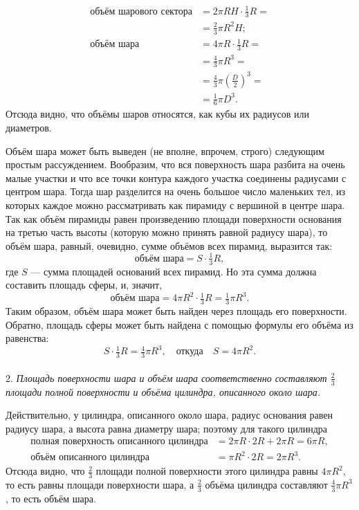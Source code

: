 \begin{align*}
\text{объём шарового сектора}&= 2\pi RH\cdot \tfrac13 R =
\\
&= \tfrac23 \pi R^2 H;
\\
\text{объём шара} &= 4\pi R\cdot \tfrac13 R = 
\\
&=\tfrac43\pi R^3=
\\
&= \tfrac43\pi\left(\frac D2\right)^3=
\\
&= \tfrac16\pi D^3.
\end{align*}
Отсюда видно, что объёмы шаров относятся, как кубы их радиусов или диаметров.

Объём шара может быть выведен (не вполне, впрочем, строго) следующим простым рассуждением.
Вообразим, что вся поверхность шара разбита на очень малые участки и что все точки контура каждого участка соединены радиусами с центром шара.
Тогда шар разделится на очень большое число маленьких тел, из которых каждое можно рассматривать как пирамиду с вершиной в центре шара.
Так как объём пирамиды равен произведению площади поверхности основания на третью часть высоты (которую можно принять равной радиусу шара), то объём шара, равный, очевидно, сумме объёмов всех пирамид, выразится так:
\[\text{объём шара} = S \cdot \tfrac13 R,\]
где $S$ — сумма площадей оснований всех пирамид.
Но эта сумма должна составить площадь сферы, и, значит,
\[\text{объём шара} = 4\pi R^2\cdot \tfrac13 R = \tfrac13 \pi R^3.\]
Таким образом, объём шара может быть найден через площадь его поверхности.
Обратно, площадь сферы может быть найдена с помощью формулы его объёма из равенства:
\[S\cdot \tfrac13 R = \tfrac43 \pi R^3,\quad\text{откуда}\quad S = 4\pi R^2.\]

\paragraph{}\label{1938/s146}
 2.
\emph{Площадь поверхности шара и объём шара соответственно составляют $\tfrac23$ площади полной поверхности и объёма цилиндра, описанного около шара.}

Действительно, у цилиндра, описанного около шара, радиус основания равен радиусу шара, а высота равна диаметру шара;
поэтому для такого цилиндра
\begin{align*}
\text{полная поверхность описанного цилиндра} &= 2\pi R \cdot 2R + 2\pi R = 6\pi R,
\\
\text{объём описанного цилиндра} &= \pi R^2\cdot 2R = 2\pi R^3.
\end{align*}
Отсюда видно, что $\tfrac23$ площади полной поверхности этого цилиндра равны $4\pi R^2$, то есть равны площади поверхности шара, а $\tfrac23$ объёма цилиндра составляют $\tfrac43\pi R^3$, то есть объём шара.

